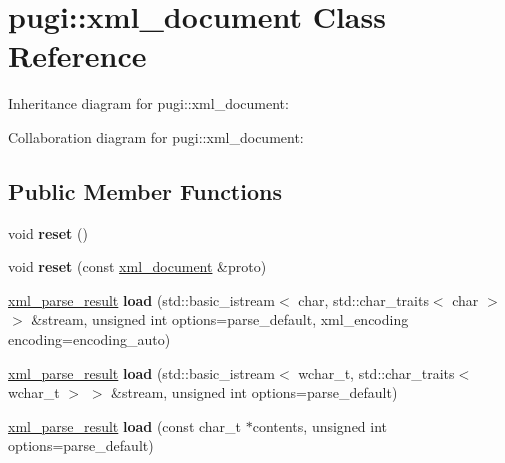 \hypertarget{classpugi_1_1xml__document}{}\section{pugi\+:\+:xml\+\_\+document Class Reference}
\label{classpugi_1_1xml__document}


Inheritance diagram for pugi\+:\+:xml\+\_\+document\+:


Collaboration diagram for pugi\+:\+:xml\+\_\+document\+:
\subsection*{Public Member Functions}
\begin{DoxyCompactItemize}
\item 
\hypertarget{classpugi_1_1xml__document_acf2b9daf1d12e12048796118b7a7685d}{}void {\bfseries reset} ()\label{classpugi_1_1xml__document_acf2b9daf1d12e12048796118b7a7685d}

\item 
\hypertarget{classpugi_1_1xml__document_a4230de3de88f4fe481c4c3d5312aa5cf}{}void {\bfseries reset} (const \hyperlink{classpugi_1_1xml__document}{xml\+\_\+document} \&proto)\label{classpugi_1_1xml__document_a4230de3de88f4fe481c4c3d5312aa5cf}

\item 
\hypertarget{classpugi_1_1xml__document_abb7db3882f94ac35b870510789a87778}{}\hyperlink{structpugi_1_1xml__parse__result}{xml\+\_\+parse\+\_\+result} {\bfseries load} (std\+::basic\+\_\+istream$<$ char, std\+::char\+\_\+traits$<$ char $>$ $>$ \&stream, unsigned int options=parse\+\_\+default, xml\+\_\+encoding encoding=encoding\+\_\+auto)\label{classpugi_1_1xml__document_abb7db3882f94ac35b870510789a87778}

\item 
\hypertarget{classpugi_1_1xml__document_a36131b6f1a80a1248666f4e7fe352685}{}\hyperlink{structpugi_1_1xml__parse__result}{xml\+\_\+parse\+\_\+result} {\bfseries load} (std\+::basic\+\_\+istream$<$ wchar\+\_\+t, std\+::char\+\_\+traits$<$ wchar\+\_\+t $>$ $>$ \&stream, unsigned int options=parse\+\_\+default)\label{classpugi_1_1xml__document_a36131b6f1a80a1248666f4e7fe352685}

\item 
\hypertarget{classpugi_1_1xml__document_ae17a77772fa21a40f3d91d9c79e60d0b}{}\hyperlink{structpugi_1_1xml__parse__result}{xml\+\_\+parse\+\_\+result} {\bfseries load} (const char\+\_\+t $\ast$contents, unsigned int options=parse\+\_\+default)\label{classpugi_1_1xml__document_ae17a77772fa21a40f3d91d9c79e60d0b}


\end{DoxyCompactItemize}
